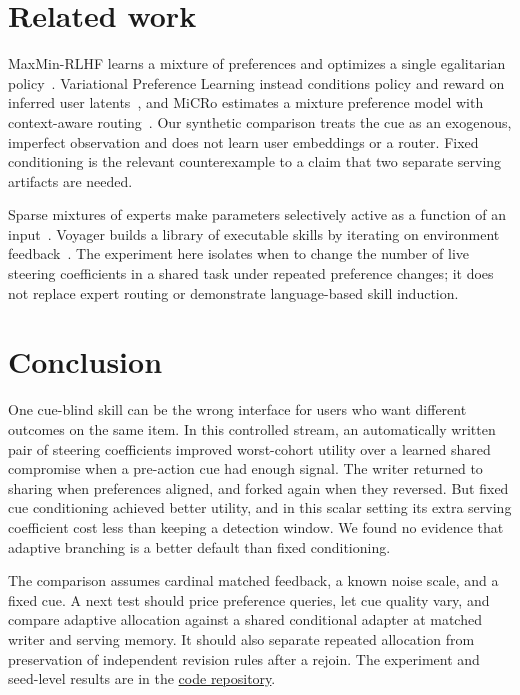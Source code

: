 \documentclass[11pt]{article}
\begin{document}
\section{Related work}
MaxMin-RLHF learns a mixture of preferences and optimizes a single egalitarian policy~\citep{chakraborty2024}. Variational Preference Learning instead conditions policy and reward on inferred user latents~\citep{poddar2024}, and MiCRo estimates a mixture preference model with context-aware routing~\citep{shen2025}. Our synthetic comparison treats the cue as an exogenous, imperfect observation and does not learn user embeddings or a router. Fixed conditioning is the relevant counterexample to a claim that two separate serving artifacts are needed.

Sparse mixtures of experts make parameters selectively active as a function of an input~\citep{shazeer2017}. Voyager builds a library of executable skills by iterating on environment feedback~\citep{wang2023}. The experiment here isolates when to change the number of live steering coefficients in a shared task under repeated preference changes; it does not replace expert routing or demonstrate language-based skill induction.

\section{Conclusion}
One cue-blind skill can be the wrong interface for users who want different outcomes on the same item. In this controlled stream, an automatically written pair of steering coefficients improved worst-cohort utility over a learned shared compromise when a pre-action cue had enough signal. The writer returned to sharing when preferences aligned, and forked again when they reversed. But fixed cue conditioning achieved better utility, and in this scalar setting its extra serving coefficient cost less than keeping a detection window. We found no evidence that adaptive branching is a better default than fixed conditioning.

The comparison assumes cardinal matched feedback, a known noise scale, and a fixed cue. A next test should price preference queries, let cue quality vary, and compare adaptive allocation against a shared conditional adapter at matched writer and serving memory. It should also separate repeated allocation from preservation of independent revision rules after a rejoin. The experiment and seed-level results are in the \href{https://github.com/manojbajaj95/cl/tree/devin/1795681610-self-branching-skills/experiments/self_branching_skills}{code repository}.
\end{document}
